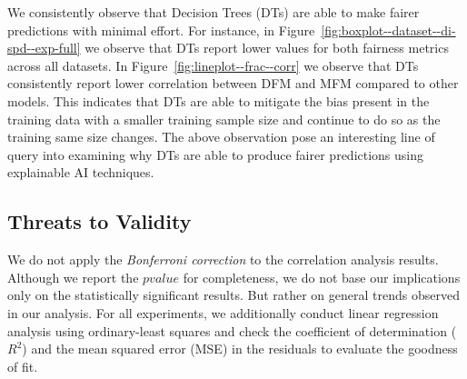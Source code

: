\documentclass{article}
\begin{document}
We consistently observe that Decision Trees (DTs) are able to make
fairer predictions with minimal effort. For instance, in
Figure \ref{fig:boxplot--dataset--di-spd--exp-full} we observe that
DTs report lower values for both fairness metrics across all
datasets. In Figure \ref{fig:lineplot--frac--corr} we observe that DTs
consistently report lower correlation between DFM and MFM compared to
other models. This indicates that DTs are able to mitigate the bias
present in the training data with a smaller training sample size and
continue to do so as the training same size changes. The above
observation pose an interesting line of query into examining why DTs
are able to produce fairer predictions using explainable AI
techniques.

\subsection{Threats to Validity}\label{sec:threats}

We do not apply the \emph{Bonferroni correction} to the correlation
analysis results. Although we report the $pvalue$ for completeness,
we do not base our implications only on the statistically significant
results. But rather on general trends observed in our analysis. For
all experiments, we additionally conduct linear regression analysis
using ordinary-least squares and check the coefficient of
determination ($R^2$) and the mean squared error (MSE) in the
residuals to evaluate the goodness of fit. 


\end{document}
